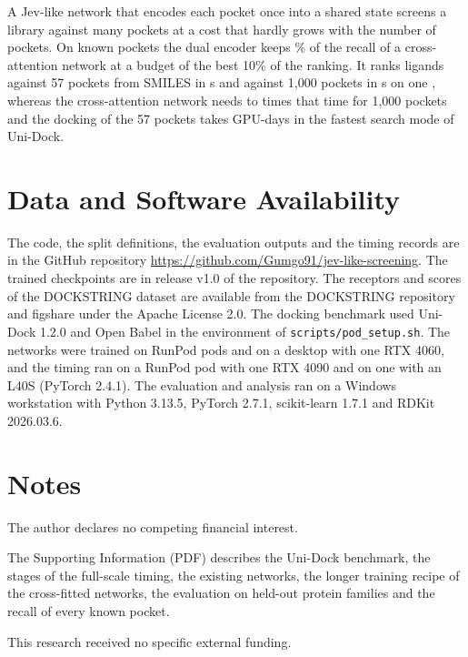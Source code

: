 \documentclass[journal=jcisd8,manuscript=article]{achemso}
\begin{document}
A Jev-like network that encodes each pocket once into a shared state screens a library against many pockets at a cost that hardly grows with the number of pockets. On \kfNTargets{} known pockets the dual encoder keeps \kfRatioDual{}\% of the recall of a cross-attention network at a budget of the best 10\% of the ranking. It ranks \tmALig{} ligands against 57 pockets from SMILES in \tmADualFiftySevenFull{} s and against 1{,}000 pockets in \tmADualThousandFull{} s on one \tmAGpu{}, whereas the cross-attention network needs \tmARatioXaHalfThousandFull{} to \tmARatioXaSingleThousandFull{} times that time for 1{,}000 pockets and the docking of the 57 pockets takes \pocketDockDaysFast{} GPU-days in the fastest search mode of Uni-Dock.

\section{Data and Software Availability}

The code, the split definitions, the evaluation outputs and the timing records are in the GitHub repository \url{https://github.com/Gumgo91/jev-like-screening}. The trained checkpoints are in release v1.0 of the repository. The receptors and scores of the DOCKSTRING dataset are available from the DOCKSTRING repository and figshare under the Apache License 2.0. The docking benchmark used Uni-Dock 1.2.0\cite{unidock} and Open Babel\cite{openbabel} in the environment of \texttt{scripts/pod\_setup.sh}. The networks were trained on RunPod pods and on a desktop with one RTX 4060, and the timing ran on a RunPod pod with one RTX 4090 and on one with an L40S (PyTorch 2.4.1). The evaluation and analysis ran on a Windows workstation with Python 3.13.5, PyTorch 2.7.1,\cite{paszke2019} scikit-learn 1.7.1\cite{sklearn} and RDKit 2026.03.6\cite{rdkit}.

\section*{Notes}
The author declares no competing financial interest.

\begin{suppinfo}
The Supporting Information (PDF) describes the Uni-Dock benchmark, the stages of the full-scale timing, the existing networks, the longer training recipe of the cross-fitted networks, the evaluation on held-out protein families and the recall of every known pocket.
\end{suppinfo}

\begin{acknowledgement}
This research received no specific external funding.
\end{acknowledgement}


\end{document}
